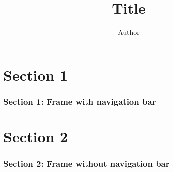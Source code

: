 \documentclass{beamer}
\title{Title}
\author{Author}
\institute{Institute}
\begin{document}
    \section{Section 1}
    \begin{frame}
        \frametitle{Section 1: Frame with navigation bar}
    \end{frame}

    \section{Section 2}
    \begin{frame}[plain]
        \frametitle{Section 2: Frame without navigation bar}
    \end{frame}
\end{document}
